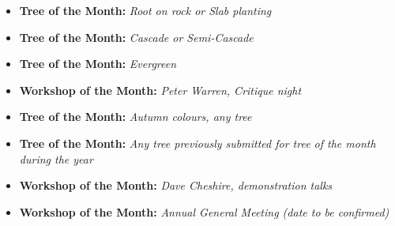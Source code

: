 \label{2025-06-calendar}
\medskip
{}
\begin{itemize}
    \item \textbf{Tree of the Month:} \textit{Root on rock or Slab planting}
\end{itemize}

\medskip
{}
\begin{itemize}
    \item \textbf{Tree of the Month:} \textit{Cascade or Semi-Cascade}
\end{itemize}

\medskip
{}
\begin{itemize}
    \item \textbf{Tree of the Month:} \textit{Evergreen}
    \item \textbf{Workshop of the Month:} \textit{\textit{Peter Warren,} Critique night}
\end{itemize}

\medskip
{}
\begin{itemize}
    \item \textbf{Tree of the Month:} \textit{Autumn colours, any tree}
\end{itemize}

\medskip
{}
\begin{itemize}
    \item \textbf{Tree of the Month:} \textit{Any tree previously submitted for tree of the month during the year}
    \item \textbf{Workshop of the Month:} \textit{\textit{Dave Cheshire,} demonstration talks}
\end{itemize}

\medskip
{}
\begin{itemize}
    \item \textbf{Workshop of the Month:} \textit{Annual General Meeting (date to be confirmed)}
\end{itemize}

